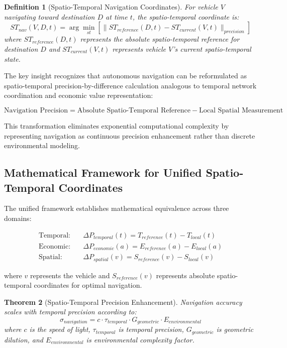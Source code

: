 \documentclass[12pt,a4paper]{article}
\newtheorem{theorem}{Theorem}[section]
\newtheorem{definition}[theorem]{Definition}
\begin{document}
\begin{definition}[Spatio-Temporal Navigation Coordinates]
For vehicle $V$ navigating toward destination $D$ at time $t$, the spatio-temporal coordinate is:
\begin{equation}
ST_{nav}(V,D,t) = \arg\min_{st} \left[ \|ST_{reference}(D,t) - ST_{current}(V,t)\|_{precision} \right]
\end{equation}
where $ST_{reference}(D,t)$ represents the absolute spatio-temporal reference for destination $D$ and $ST_{current}(V,t)$ represents vehicle $V$'s current spatio-temporal state.
\end{definition}

The key insight recognizes that autonomous navigation can be reformulated as spatio-temporal precision-by-difference calculation analogous to temporal network coordination and economic value representation:

\begin{equation}
\text{Navigation Precision} = \text{Absolute Spatio-Temporal Reference} - \text{Local Spatial Measurement}
\end{equation}

This transformation eliminates exponential computational complexity by representing navigation as continuous precision enhancement rather than discrete environmental modeling.

\subsection{Mathematical Framework for Unified Spatio-Temporal Coordinates}

The unified framework establishes mathematical equivalence across three domains:

\begin{align}
\text{Temporal:} \quad &\Delta P_{temporal}(t) = T_{reference}(t) - T_{local}(t) \\
\text{Economic:} \quad &\Delta P_{economic}(a) = E_{reference}(a) - E_{local}(a) \\
\text{Spatial:} \quad &\Delta P_{spatial}(v) = S_{reference}(v) - S_{local}(v)
\end{align}

where $v$ represents the vehicle and $S_{reference}(v)$ represents absolute spatio-temporal coordinates for optimal navigation.

\begin{theorem}[Spatio-Temporal Precision Enhancement]
Navigation accuracy scales with temporal precision according to:
\begin{equation}
\sigma_{navigation} = c \cdot \tau_{temporal} \cdot G_{geometric} \cdot E_{environmental}
\end{equation}
where $c$ is the speed of light, $\tau_{temporal}$ is temporal precision, $G_{geometric}$ is geometric dilution, and $E_{environmental}$ is environmental complexity factor.
\end{theorem}
\end{document}
